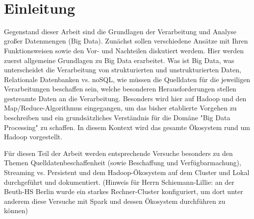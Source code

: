 \documentclass[11pt, a4paper]{book}
\begin{document}
\maketitle
~
\newpage

\pagestyle{empty}
\clearpage{}
\clearpage{}
\pagestyle{fancy}
\setcounter{page}{1}
\setcounter{chapter}{1}

\vspace{10ex}


\section{Einleitung}
Gegenstand dieser Arbeit sind die Grundlagen der Verarbeitung und Analyse großer Datenmengen (Big Data). Zunächst sollen verschiedene Ansätze mit Ihren Funktionsweisen sowie den Vor- und Nachteilen diskutiert werdem. Hier werden zuerst allgemeine Grundlagen zu Big Data erarbeitet. Was ist Big Data, was unterscheidet die Verarbeitung von strukturierten und unstrukturierten Daten, Relationale Datenbanken vs. noSQL, wie müssen die Quelldaten für die jeweiligen Verarbeitungen beschaffen sein, welche besonderen Herausforderungen stellen gestreamte Daten an die Verarbeitung. Besonders wird hier auf Hadoop und den Map/Reduce-Algorithmus eingegangen, um das bisher etablierte Vorgehen zu beschreiben und ein grundsätzliches Verständnis für die Domäne "Big Data Processing" zu schaffen. In diesem Kontext wird das gesamte Ökosystem rund um Hadoop vorgestellt. 

Für diesen Teil der Arbeit werden entsprechende Versuche besonders zu den Themen 
Quelldatenbeschaffenheit (sowie Beschaffung und Verfügbarmachung), Streaming vs. Persistent und dem Hadoop-Ökosystem auf dem Cluster und Lokal durchgeführt und dokumentiert.
(Hinweis für Herrn Schiemann-Lillie: an der Beuth-HS Berlin wurde ein starkes Rechner-Cluster konfiguriert, um dort unter anderem diese Versuche mit Spark und dessen Ökosystem durchführen zu können)
\end{document}
